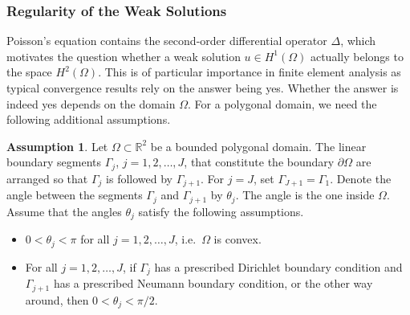 \documentclass[english, 12pt, a4paper, sci, utf8, a-2b, online]{aaltothesis}
\theoremstyle{definition}
\newtheorem{assumption}{Assumption}[section]
\theoremstyle{plain}
\numberwithin{equation}{section}
\begin{document}
\subsubsection{Regularity of the Weak Solutions}
\label{subsubsec:regularity_of_the_weak_solutions}

Poisson's equation contains the second-order differential operator $\Delta$,
which motivates the question whether a weak solution $u \in H^1(\Omega)$
actually belongs to the space $H^2(\Omega)$.
This is of particular importance in finite element analysis as typical convergence
results rely on the answer being yes. Whether the answer is indeed yes
depends on the domain $\Omega$. For a polygonal domain, we need the following
additional assumptions.
\begin{assumption}
    \label{ass:regular_polygonal_domain}
    Let $\Omega \subset \mathbb{R}^2$ be a bounded polygonal domain.
    The linear boundary segments $\Gamma_j$, $j = 1,2,\dotsc,J$,
    that constitute the boundary $\partial \Omega$ are arranged so that
    $\Gamma_j$ is followed by $\Gamma_{j+1}$.
    For $j=J$, set $\Gamma_{J+1} = \Gamma_1$.
    Denote the angle between the segments $\Gamma_j$ and $\Gamma_{j+1}$
    by $\theta_j$. The angle is the one inside $\Omega$.
    Assume that the angles $\theta_j$ satisfy the following assumptions.
    \begin{itemize}[(i)]
        \item $0 < \theta_j < \pi$ for all $j=1,2,\dotsc,J$,
        i.e.\ $\Omega$ is convex.
        \item For all $j=1,2,\dotsc,J$, if $\Gamma_j$ has a prescribed
        Dirichlet boundary condition and $\Gamma_{j+1}$ has a prescribed
        Neumann boundary condition, or the other way around, then
        $0 < \theta_j < \pi / 2$.
    \end{itemize}
\end{assumption}
\end{document}
